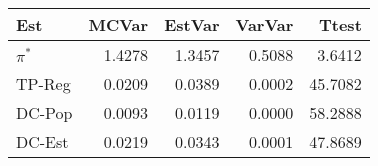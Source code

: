 
\begin{tabular}{lrrrr}
\toprule
Est & MCVar & EstVar & VarVar & Ttest\\
\midrule
$\pi^*$ & 1.4278 & 1.3457 & 0.5088 & 3.6412\\
TP-Reg & 0.0209 & 0.0389 & 0.0002 & 45.7082\\
DC-Pop & 0.0093 & 0.0119 & 0.0000 & 58.2888\\
DC-Est & 0.0219 & 0.0343 & 0.0001 & 47.8689\\
\bottomrule
\end{tabular}